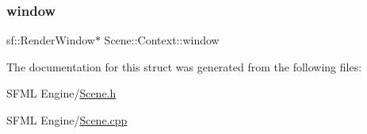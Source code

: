 \subsubsection{\texorpdfstring{window}{window}}
{\footnotesize\ttfamily sf\+::\+Render\+Window$\ast$ Scene\+::\+Context\+::window}



The documentation for this struct was generated from the following files\+:\begin{DoxyCompactItemize}
\item 
S\+F\+M\+L Engine/\hyperlink{_scene_8h}{Scene.\+h}\item 
S\+F\+M\+L Engine/\hyperlink{_scene_8cpp}{Scene.\+cpp}\end{DoxyCompactItemize}

